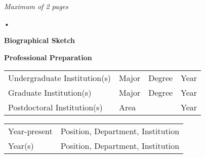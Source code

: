 
\begin{center}
\emph{Maximum of 2 pages}
\end{center}•





\setcounter{page}{1}
\renewcommand{\thepage}{Biographical Sketch - Page \arabic{page} of 2}
\begin{center}
\textbf{\large Biographical Sketch}
\end{center}

{\bf Professional Preparation}

\begin{tabular}{llll}
Undergraduate Institution(s) \hspace{0.5in} & Major \hspace{1in} & Degree  \hspace{0.25in} & Year \\
Graduate Institution(s)                     & Major              & Degree                  & Year \\
Postdoctoral Institution(s)                 & Area               &                         & Year
\end{tabular}




\begin{tabular}{ll}
Year-present & Position, Department, Institution \\
Year(s)      & Position, Department, Institution \\
\end{tabular}

